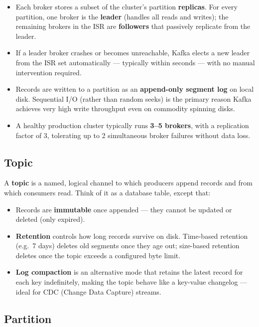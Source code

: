 \begin{itemize}
  \item Each broker stores a subset of the cluster's partition \textbf{replicas}.
        For every partition, one broker is the \textbf{leader} (handles all reads and writes);
        the remaining brokers in the ISR are \textbf{followers} that passively replicate from the leader.
  \item If a leader broker crashes or becomes unreachable, Kafka elects a new leader from the ISR set
        automatically — typically within seconds — with no manual intervention required.
  \item Records are written to a partition as an \textbf{append-only segment log} on local disk.
        Sequential I/O (rather than random seeks) is the primary reason Kafka achieves very high write throughput
        even on commodity spinning disks.
  \item A healthy production cluster typically runs \textbf{3–5 brokers}, with a replication factor of 3,
        tolerating up to 2 simultaneous broker failures without data loss.
\end{itemize}

\subsection{Topic}

A \textbf{topic} is a named, logical channel to which producers append records and from which
consumers read.
Think of it as a database table, except that:

\begin{itemize}
  \item Records are \textbf{immutable} once appended — they cannot be updated or deleted (only expired).
  \item \textbf{Retention} controls how long records survive on disk.
        Time-based retention (e.g.\ 7 days) deletes old segments once they age out;
        size-based retention deletes once the topic exceeds a configured byte limit.
  \item \textbf{Log compaction} is an alternative mode that retains the latest record for each key indefinitely,
        making the topic behave like a key-value changelog — ideal for CDC (Change Data Capture) streams.
\end{itemize}

\subsection{Partition}

